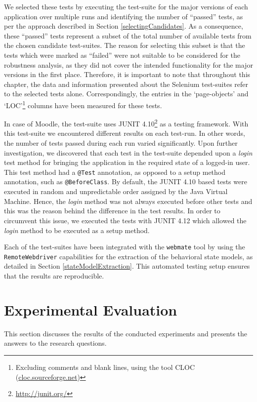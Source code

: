 We selected these tests by executing the test-suite for the major versions of each application over multiple runs and identifying the number of ``passed'' tests, as per the approach described in Section \ref{selectingCandidates}. As a consequence, these ``passed'' tests represent a subset of the total number of available tests from the chosen candidate test-suites. The reason for selecting this subset is that the tests which were marked as ``failed'' were not suitable to be considered for the robustness analysis, as they did not cover the intended functionality for the major versions in the first place. 
Therefore, it is important to note that throughout this chapter, the data and information presented about the Selenium test-suites refer to the selected tests alone. Correspondingly, the entries in the `page-objects' and `LOC'\footnote{Excluding comments and blank lines, using the tool CLOC (\url{cloc.sourceforge.net})} columns have been measured for these tests.

In case of Moodle, the test-suite uses JUNIT 4.10\footnote{\url{http://junit.org/}} as a testing framework. With this test-suite we encountered different results on each test-run. In other words, the number of tests passed during each run varied significantly. Upon further investigation, we discovered that each test in the test-suite depended upon a \textit{login} test method for bringing the application in the required state of a logged-in user. This test method had a \texttt{@Test} annotation, as opposed to a setup method annotation, such as \texttt{@BeforeClass}. By default, the JUNIT 4.10 based tests were executed in random and unpredictable order assigned by the Java Virtual Machine. Hence, the \textit{login} method was not always executed before other tests and this was the reason behind the difference in the test results. In order to circumvent this issue, we executed the tests with JUNIT 4.12 which allowed the \textit{login} method to be executed as a setup method. 

Each of the test-suites have been integrated with the \texttt{webmate} tool by using the \texttt{RemoteWebdriver} capabilities for the extraction of the behavioral state models, as detailed in Section \ref{stateModelExtraction}. This automated testing setup ensures that the results are reproducible. 

\section{Experimental Evaluation}
\label{expeval}
This section discusses the results of the conducted experiments and presents the answers to the research questions. 

